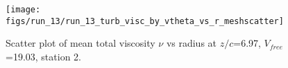 \begin{figure}[H]
\centering
\texttt{[image: figs/run\_13/run\_13\_turb\_visc\_by\_vtheta\_vs\_r\_meshscatter]}
\caption{Scatter plot of mean total viscosity $\nu$ vs radius at $z/c$=6.97, $V_{free}$=19.03, station 2.}
\label{fig:run_13_turb_visc_by_vtheta_vs_r_meshscatter}
\end{figure}



